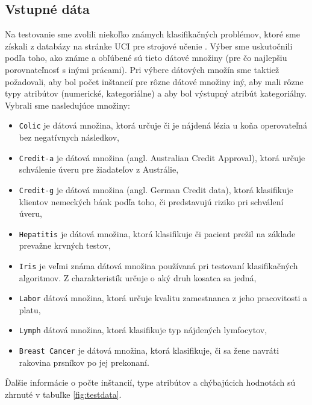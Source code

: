 \subsection{Vstupné dáta}
Na testovanie sme zvolili niekoľko známych klasifikačných problémov, ktoré sme získali z databázy na stránke UCI pre strojové učenie \cite{online-uci}. Výber sme uskutočnili podľa toho, ako známe a obľúbené sú tieto dátové množiny (pre čo najlepšiu porovnateľnosť s inými prácami). Pri výbere dátových množín sme taktiež požadovali, aby bol počet inštancií pre rôzne dátové množiny iný, aby mali rôzne typy atribútov (numerické, kategoriálne) a aby bol výstupný atribút kategoriálny. Vybrali sme nasledujúce množiny:
\begin{itemize}
\item \verb|Colic| je dátová množina, ktorá určuje či je nájdená lézia u koňa operovateľná bez negatívnych následkov,
\item \verb|Credit-a| je dátová množina (angl. Australian Credit Approval), ktorá určuje schválenie úveru pre žiadateľov z Austrálie,
\item \verb|Credit-g| je dátová množina (angl. German Credit data), ktorá klasifikuje klientov nemeckých bánk podľa toho, či predstavujú riziko pri schválení úveru,
\item \verb|Hepatitis| je dátová množina, ktorá klasifikuje či pacient prežil na základe prevažne krvných testov,
\item \verb|Iris| je veľmi známa dátová množina používaná pri testovaní klasifikačných algoritmov. Z charakteristík určuje o aký druh kosatca sa jedná,
\item \verb|Labor| dátová množina, ktorá určuje kvalitu zamestnanca z jeho pracovitosti a platu,
\item \verb|Lymph| dátová množina, ktorá klasifikuje typ nájdených lymfocytov,
\item \verb|Breast Cancer| je dátová množina, ktorá klasifikuje, či sa žene navráti rakovina prsníkov po jej prekonaní.
\end{itemize}

Ďalšie informácie o počte inštancií, type atribútov a chýbajúcich hodnotách
sú zhrnuté v tabuľke \ref{fig:testdata}.

